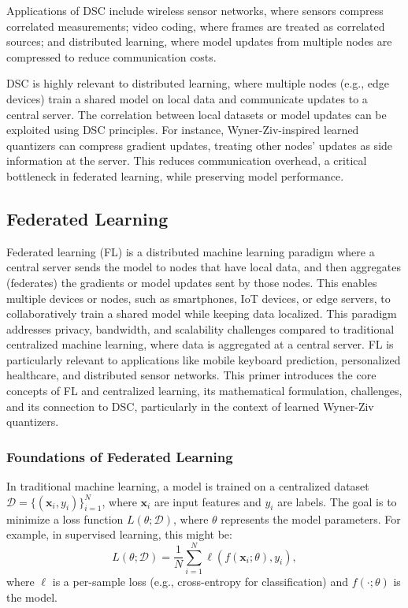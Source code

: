 Applications of DSC include wireless sensor networks, where sensors compress correlated measurements; video coding, where frames are treated as correlated sources; and distributed learning, where model updates from multiple nodes are compressed to reduce communication costs.

DSC is highly relevant to distributed learning, where multiple nodes (e.g., edge devices) train a shared model on local data and communicate updates to a central server. The correlation between local datasets or model updates can be exploited using DSC principles. For instance, Wyner-Ziv-inspired learned quantizers can compress gradient updates, treating other nodes' updates as side information at the server. This reduces communication overhead, a critical bottleneck in federated learning, while preserving model performance.


\subsection{Federated Learning}
Federated learning (FL) is a distributed machine learning paradigm where a central server sends the model to nodes that have local data, and then aggregates (federates) the gradients or model updates sent by those nodes.
This enables multiple devices or nodes, such as smartphones, IoT devices, or edge servers, to collaboratively train a shared model while keeping data localized. This paradigm addresses privacy, bandwidth, and scalability challenges compared to traditional centralized machine learning, where data is aggregated at a central server. FL is particularly relevant to applications like mobile keyboard prediction, personalized healthcare, and distributed sensor networks. This primer introduces the core concepts of FL and centralized learning, its mathematical formulation, challenges, and its connection to DSC, particularly in the context of learned Wyner-Ziv quantizers.

\subsubsection{Foundations of Federated Learning}

In traditional machine learning, a model is trained on a centralized dataset $\mathcal{D} = \{(\mathbf{x}_i, y_i)\}_{i=1}^N$, where $\mathbf{x}_i$ are input features and $y_i$ are labels. The goal is to minimize a loss function $L(\theta; \mathcal{D})$, where $\theta$ represents the model parameters. For example, in supervised learning, this might be:
\begin{equation}
    L(\theta; \mathcal{D}) = \frac{1}{N} \sum_{i=1}^N \ell(f(\mathbf{x}_i; \theta), y_i),
\end{equation}
where $\ell$ is a per-sample loss (e.g., cross-entropy for classification) and $f(\cdot; \theta)$ is the model.

